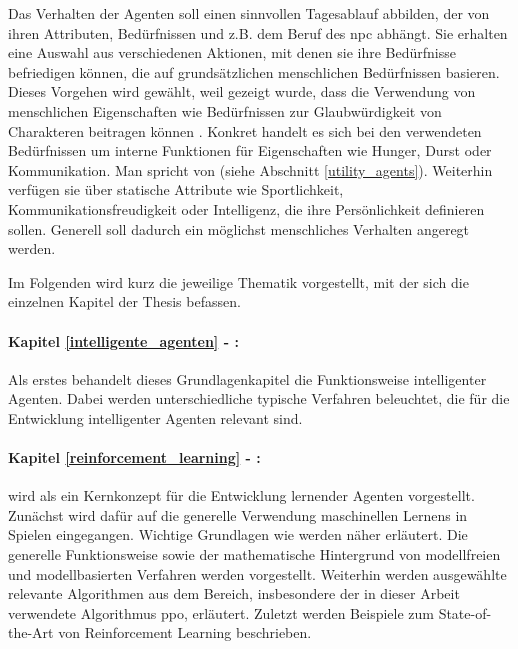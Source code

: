 Das Verhalten der Agenten soll einen sinnvollen Tagesablauf abbilden, der von ihren Attributen, Bedürfnissen und z.B. dem Beruf des \ac{npc} abhängt. Sie erhalten eine Auswahl aus verschiedenen Aktionen, mit denen sie ihre Bedürfnisse befriedigen können, die auf grundsätzlichen menschlichen Bedürfnissen basieren. Dieses Vorgehen wird gewählt, weil gezeigt wurde, dass die Verwendung von menschlichen Eigenschaften wie Bedürfnissen zur Glaubwürdigkeit von Charakteren beitragen können \cite{fallon:believable_background_characters}. Konkret handelt es sich bei den verwendeten Bedürfnissen um interne Funktionen für Eigenschaften wie Hunger, Durst oder Kommunikation. Man spricht von  (siehe Abschnitt \ref{utility_agents}). Weiterhin verfügen sie über statische Attribute wie Sportlichkeit, Kommunikationsfreudigkeit oder Intelligenz, die ihre Persönlichkeit definieren sollen. Generell soll dadurch ein möglichst menschliches Verhalten angeregt werden.

Im Folgenden wird kurz die jeweilige Thematik vorgestellt, mit der sich die einzelnen Kapitel der Thesis befassen.

\paragraph{Kapitel \ref{intelligente_agenten} - :}
Als erstes behandelt dieses Grundlagenkapitel die Funktionsweise intelligenter Agenten. Dabei werden unterschiedliche typische Verfahren beleuchtet, die für die Entwicklung intelligenter Agenten relevant sind.

\paragraph{Kapitel \ref{reinforcement_learning} - :}
 wird als ein Kernkonzept für die Entwicklung lernender Agenten vorgestellt. Zunächst wird dafür auf die generelle Verwendung maschinellen Lernens in Spielen eingegangen. Wichtige Grundlagen wie  werden näher erläutert. Die generelle Funktionsweise sowie der mathematische Hintergrund von modellfreien und modellbasierten Verfahren werden vorgestellt. Weiterhin werden ausgewählte relevante Algorithmen aus dem Bereich, insbesondere der in dieser Arbeit verwendete Algorithmus \ac{ppo}, erläutert. Zuletzt werden Beispiele zum State-of-the-Art von Reinforcement Learning beschrieben.

